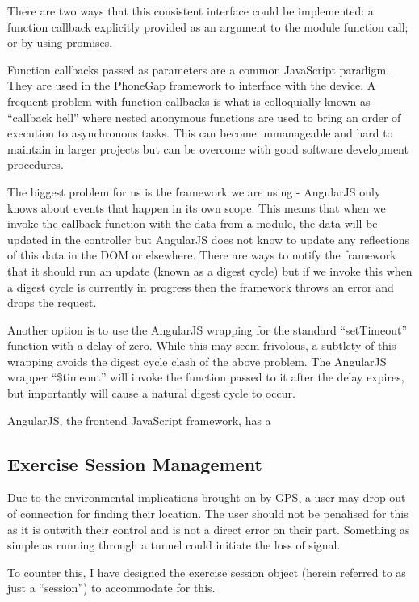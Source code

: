 There are two ways that this consistent interface could be
implemented: a function callback explicitly provided as an argument to
the module function call; or by using promises.

Function callbacks passed as parameters are a common JavaScript
paradigm. They are used in the PhoneGap framework to interface with
the device\cite{phonegap_currentpos}. A frequent problem with function
callbacks is what is colloquially known as ``callback hell''
\cite{callback_hell} where nested anonymous functions are used to
bring an order of execution to asynchronous tasks. This can become
unmanageable and hard to maintain in larger projects but can be
overcome with good software development procedures.

The biggest problem for us is the framework we are using - AngularJS
only knows about events that happen in its own scope. This means that
when we invoke the callback function with the data from a module, the
data will be updated in the controller but AngularJS does not know to
update any reflections of this data in the DOM or elsewhere. There are
ways to notify the framework that it should run an update (known as a
digest cycle)\cite{angularjs_apply} but if we invoke this when a
digest cycle is currently in progress then the framework throws an
error and drops the request.

Another option is to use the AngularJS wrapping for the standard
``setTimeout'' function with a delay of zero. While this may seem
frivolous, a subtlety of this wrapping avoids the digest cycle clash
of the above problem. The AngularJS wrapper ``\$timeout'' will invoke
the function passed to it after the delay expires, but importantly
will cause a natural digest cycle to occur. 


AngularJS\cite{angularjs}, the frontend JavaScript framework, has a 

\subsection{Exercise Session Management}
\label{sec:session_mgmt}
Due to the environmental implications brought on by GPS, a user may
drop out of connection for finding their location. The user should not
be penalised for this as it is outwith their control and is not a
direct error on their part. Something as simple as running through a
tunnel could initiate the loss of signal. 

To counter this, I have designed the exercise session object (herein
referred to as just a ``session'') to accommodate for this.

